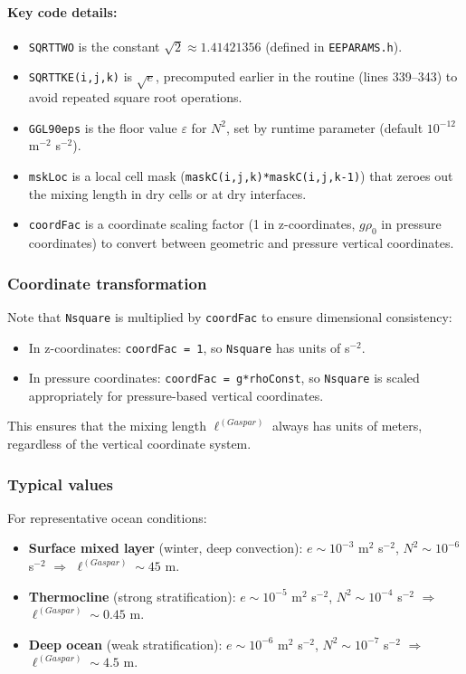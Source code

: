 \documentclass[12pt,letterpaper]{article}
\begin{document}
\paragraph{Key code details:}
\begin{itemize}
\item \verb|SQRTTWO| is the constant $\sqrt{2} \approx 1.41421356$ (defined in \verb|EEPARAMS.h|).
\item \verb|SQRTTKE(i,j,k)| is $\sqrt{e}$, precomputed earlier in the routine (lines 339--343) to avoid repeated square root operations.
\item \verb|GGL90eps| is the floor value $\varepsilon$ for $N^2$, set by runtime parameter (default $10^{-12}$ m$^{-2}$ s$^{-2}$).
\item \verb|mskLoc| is a local cell mask (\verb|maskC(i,j,k)*maskC(i,j,k-1)|) that zeroes out the mixing length in dry cells or at dry interfaces.
\item \verb|coordFac| is a coordinate scaling factor (1 in z-coordinates, $g \rho_0$ in pressure coordinates) to convert between geometric and pressure vertical coordinates.
\end{itemize}

\subsubsection{Coordinate transformation}

Note that \verb|Nsquare| is multiplied by \verb|coordFac| to ensure dimensional consistency:
\begin{itemize}
\item In z-coordinates: \verb|coordFac = 1|, so \verb|Nsquare| has units of s$^{-2}$.
\item In pressure coordinates: \verb|coordFac = g*rhoConst|, so \verb|Nsquare| is scaled appropriately for pressure-based vertical coordinates.
\end{itemize}

This ensures that the mixing length $\ell^{(Gaspar)}$ always has units of meters, regardless of the vertical coordinate system.

\subsubsection{Typical values}

For representative ocean conditions:
\begin{itemize}
\item \textbf{Surface mixed layer} (winter, deep convection): $e \sim 10^{-3}$ m$^2$ s$^{-2}$, $N^2 \sim 10^{-6}$ s$^{-2}$ $\Rightarrow$ $\ell^{(Gaspar)} \sim 45$ m.
\item \textbf{Thermocline} (strong stratification): $e \sim 10^{-5}$ m$^2$ s$^{-2}$, $N^2 \sim 10^{-4}$ s$^{-2}$ $\Rightarrow$ $\ell^{(Gaspar)} \sim 0.45$ m.
\item \textbf{Deep ocean} (weak stratification): $e \sim 10^{-6}$ m$^2$ s$^{-2}$, $N^2 \sim 10^{-7}$ s$^{-2}$ $\Rightarrow$ $\ell^{(Gaspar)} \sim 4.5$ m.
\end{itemize}
\end{document}
